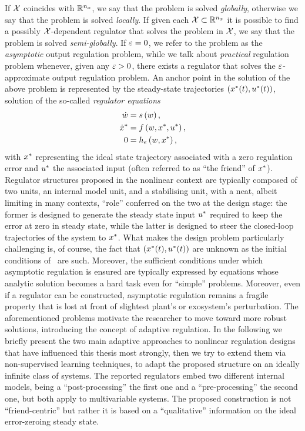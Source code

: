 If $\mathcal{X}$ coincides with $\mathbb{R}^{n_{x}}$, we say that the problem is solved \emph{globally}, otherwise we say that the problem
is solved \emph{locally}. If given each $\mathcal{X} \subset \mathbb{R}^{n_{x}}$ it is possible to find a possibly $\mathcal{X}$-dependent regulator 
that solves the problem in $\mathcal{X}$, we say that the problem is solved \emph{semi-globally}.
If $\varepsilon = 0$, we refer to the problem as the \emph{asymptotic} output regulation problem, while we talk about
\emph{practical} regulation problem whenever, given any $\varepsilon > 0$, there exists a regulator that solves the $\varepsilon$-approximate
output regulation problem. An anchor point in the solution of the above problem is represented by the
steady-state trajectories $\left( x^{*}(t), u^{*}(t) \right)$, solution of the so-called \emph{regulator equations}
\begin{equation}%
    \label{EQ:GENERAL-REGULATOR-EQUATIONS}
    \begin{split}
        \dot{\ww} & = \wfun \lp \ww \rp, \\ 
        \dot{\xx}^{*} & = \xfun \lp \ww, \xx^{*}, \uu^{*} \rp, \\
        0 & = \efun \lp \ww, \xx^{*} \rp,
    \end{split}
\end{equation}
with $x^{*}$ representing the ideal state trajectory associated with a zero regulation error and $u^{*}$
the associated input (often referred to as ``the friend'' of $x^{*}$).
Regulator structures proposed in the nonlinear context are typically composed of two units, an internal model unit,
and a stabilising unit, with a neat, albeit limiting in many contexts, ``role'' conferred on the two at the design stage:
the former is designed to generate the steady state input $u^{*}$ required to keep the error at zero in steady state,
while the latter is designed to steer the closed-loop trajectories of the system to $x^{*}$.
What makes the design problem particularly challenging is, of course, the fact that $\left( x^{*}(t), u^{*}(t) \right)$
are unknown as the initial conditions of~ are such.
Moreover, the sufficient conditions under which asymptotic regulation is ensured are typically expressed by equations
whose analytic solution becomes a hard task even for ``simple'' problems. Moreover, even if a regulator can be constructed,
asymptotic regulation remains a fragile property that is lost at front of slightest plant's or exosystem's perturbation.
The aforementioned problems motivate the researcher to move toward more robust solutions, introducing the concept of adaptive regulation.
In the following we briefly present the two main adaptive approaches to nonlinear regulation designs that have influenced this thesis most strongly,
then we try to extend them via non-supervised learning techniques, to adapt the proposed structure on an ideally infinite class of systems.
The reported regulators embed two different internal models, being a ``post-processing'' the first one and a ``pre-processing'' the second one,
but both apply to multivariable systems. The proposed construction is not ``friend-centric'' but rather it is based on a
``qualitative'' information on the ideal error-zeroing steady state.

